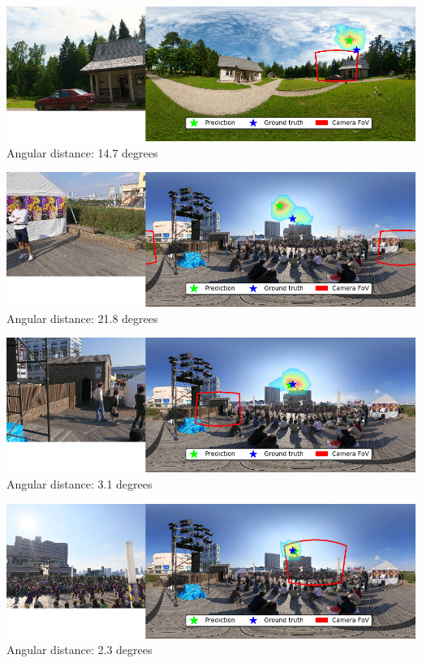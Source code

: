 \begin{multicols}{2}
\includegraphics[width=\mywidth]{pano_aazdyyemiqnyfe_002.jpg}\\
Angular distance: 14.7 degrees

\includegraphics[width=\mywidth]{pano_abapzyetpqwuls_002.jpg}\\
Angular distance: 21.8 degrees

\includegraphics[width=\mywidth]{pano_abapzyetpqwuls_003.jpg}\\
Angular distance: 3.1 degrees

\includegraphics[width=\mywidth]{pano_abapzyetpqwuls_006.jpg}\\
Angular distance: 2.3 degrees

\end{multicols}


